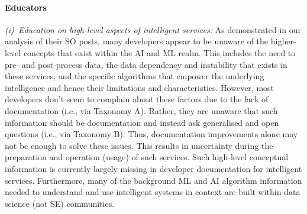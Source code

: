 \paragraph{Educators}
\label{icse2020:sssec:educators}

\textit{(i)~Education on high-level aspects of intelligent services:} As demonstrated in our analysis of their SO posts, many developers appear to be unaware of the higher-level concepts that exist within the AI and ML realm. This includes the need to pre- and post-process data, the data dependency and instability that exists in these services, and the specific algorithms that empower the underlying intelligence and hence their limitations and characteristics. However, most developers don't seem to complain about these factors due to the lack of documentation (i.e., via Taxonomy A). Rather, they are unaware that such information should be documentation and instead ask generalised and open questions (i.e., via Taxonomy B). Thus, documentation improvements alone may not be enough to solve these issues. This results in uncertainty during the preparation and operation (usage) of such services.  Such high-level conceptual information is currently largely missing in developer documentation for intelligent services. Furthermore, many of the background ML and AI algorithm information needed to understand and use intelligent systems in context are built within data science (not SE) communities. 

